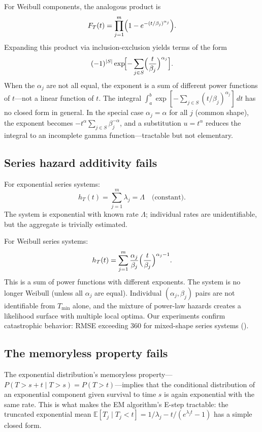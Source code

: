 \documentclass[12pt]{article}
\theoremstyle{definition}
\theoremstyle{remark}
\newcommand{\E}{\mathbb{E}}
\begin{document}
For Weibull components, the analogous product is
\begin{equation}\label{eq:weibull-cdf-product}
  F_T(t) = \prod_{j=1}^m
    \Bigl(1 - e^{-(t/\beta_j)^{\alpha_j}}\Bigr).
\end{equation}
Expanding this product via inclusion-exclusion yields terms of the
form
\[
  (-1)^{|S|} \exp\!\Bigl[-\sum_{j \in S}
    \Bigl(\frac{t}{\beta_j}\Bigr)^{\alpha_j}\Bigr].
\]
When the $\alpha_j$ are not all equal, the exponent is a sum of
different power functions of $t$---not a linear function of $t$.
The integral $\int_a^b \exp[-\sum_{j \in S}
(t/\beta_j)^{\alpha_j}]\, dt$ has no closed form in general.  In
the special case $\alpha_j = \alpha$ for all $j$ (common shape),
the exponent becomes $-t^\alpha \sum_{j \in S} \beta_j^{-\alpha}$,
and a substitution $u = t^\alpha$ reduces the integral to an
incomplete gamma function---tractable but not elementary.

\subsection{Series hazard additivity fails}

For exponential series systems:
\[
  h_T(t) = \sum_{j=1}^m \lambda_j = \Lambda \quad
  \text{(constant)}.
\]
The system is exponential with known rate $\Lambda$; individual
rates are unidentifiable, but the aggregate is trivially estimated.

For Weibull series systems:
\[
  h_T(t) = \sum_{j=1}^m \frac{\alpha_j}{\beta_j}
    \Bigl(\frac{t}{\beta_j}\Bigr)^{\alpha_j - 1}.
\]
This is a sum of power functions with different exponents.  The
system is no longer Weibull (unless all $\alpha_j$ are equal).
Individual $(\alpha_j, \beta_j)$ pairs are not identifiable from
$T_{\min}$ alone, and the mixture of power-law hazards creates a
likelihood surface with multiple local optima.  Our experiments
confirm catastrophic behavior: RMSE exceeding 360 for mixed-shape
series systems ().

\subsection{The memoryless property fails}

The exponential distribution's memoryless property---$P(T > s + t
\mid T > s) = P(T > t)$---implies that the conditional
distribution of an exponential component given survival to time $s$
is again exponential with the same rate.  This is what makes the EM
algorithm's E-step tractable: the truncated exponential mean
$\E[T_j \mid T_j < t] = 1/\lambda_j -
t/(e^{\lambda_j t} - 1)$ has a simple closed form.
\end{document}
